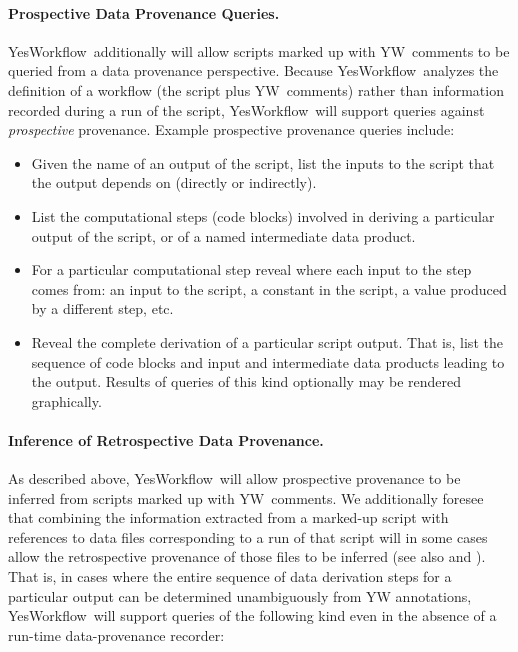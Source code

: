 \documentclass{article}
\newcommand{\YW}{\textsf{YesWorkflow}}
\newcommand{\yw}{\textsf{YW}}
\begin{document}
\paragraph{Prospective Data Provenance Queries.}
\YW\ additionally will allow scripts
marked up with \yw\ comments to be queried from a data provenance
perspective. Because \YW\ analyzes the definition of a workflow (the
script plus \yw\ comments) rather than information recorded during a
run of the script,  \YW\ will support queries
against \emph{prospective} provenance.
%
Example prospective provenance queries include:
\begin{itemize}
\item Given the name of an output of the script, list the inputs to
  the script that the output depends on (directly or indirectly). 
\item List the computational steps (code blocks) involved in deriving
  a particular output of the script, or of a named intermediate data
  product. 
\item For a particular computational step reveal where each input to
  the step comes from: an input to the script, a constant in the
  script, a value produced by a different step, etc. 
\item Reveal the complete derivation of a particular script output.
  That is, list the sequence of code blocks and input and intermediate
  data products leading to the output. Results of queries of this kind
  optionally may be rendered graphically. 
\end{itemize}

\paragraph{Inference of Retrospective Data Provenance.}
As described above, \YW\ will allow prospective provenance to be
inferred from scripts marked up with \yw\ comments.  We additionally
foresee that combining the information extracted from a marked-up
script with references to data files corresponding to a run of that
script will in some cases allow the retrospective provenance of those files to be
inferred (see also \cite{Bowers2012Provenance} and
\cite{Zinn2010Abstract}). That is, in cases where the entire sequence of data
derivation steps for a particular output can be determined unambiguously from YW
annotations, \YW\ will support queries of the following kind even in the absence of a
run-time data-provenance recorder:
\end{document}
